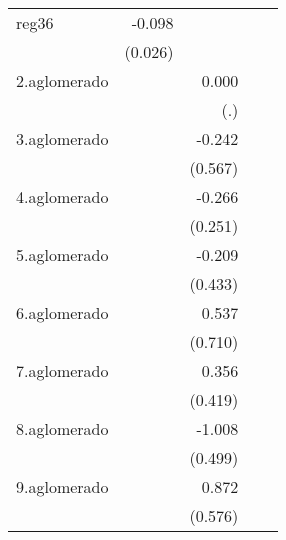 {\begin{longtable}{l*{4}{D{.}{.}{-1}}}
\addlinespace
reg36       &      -0.098\sym{***}&                     &                     &                     \\
            &     (0.026)         &                     &                     &                     \\
\addlinespace
2.aglomerado&                     &       0.000         &                     &                     \\
            &                     &         (.)         &                     &                     \\
\addlinespace
3.aglomerado&                     &      -0.242         &                     &                     \\
            &                     &     (0.567)         &                     &                     \\
\addlinespace
4.aglomerado&                     &      -0.266         &                     &                     \\
            &                     &     (0.251)         &                     &                     \\
\addlinespace
5.aglomerado&                     &      -0.209         &                     &                     \\
            &                     &     (0.433)         &                     &                     \\
\addlinespace
6.aglomerado&                     &       0.537         &                     &                     \\
            &                     &     (0.710)         &                     &                     \\
\addlinespace
7.aglomerado&                     &       0.356         &                     &                     \\
            &                     &     (0.419)         &                     &                     \\
\addlinespace
8.aglomerado&                     &      -1.008\sym{*}  &                     &                     \\
            &                     &     (0.499)         &                     &                     \\
\addlinespace
9.aglomerado&                     &       0.872         &                     &                     \\
            &                     &     (0.576)         &                     &                     \\

\end{longtable}}
